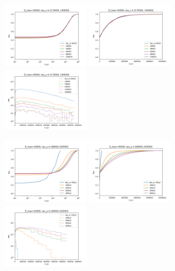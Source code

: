 \documentclass[crop]{CSLB}%
\begin{document}
\begin{figure}
   \centering
   \includegraphics[width=0.33\textwidth]{waiting_a_acum_log.png}%
   \includegraphics[width=0.33\textwidth]{waiting_a_acum_lin.png}%
   \includegraphics[width=0.33\textwidth]{waiting_a_dif.png}

   \includegraphics[width=0.33\textwidth]{waiting_s_acum_log.png}%
   \includegraphics[width=0.33\textwidth]{waiting_s_acum_lin.png}%
   \includegraphics[width=0.33\textwidth]{waiting_s_dif.png}


\end{figure}
\end{document}
